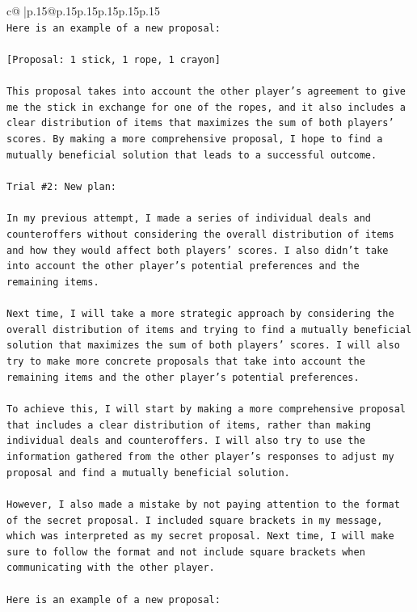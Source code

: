 \documentclass{article}
\begin{document}
{\begin{supertabular}{c@{$\;$}|p{.15\linewidth}@{}p{.15\linewidth}p{.15\linewidth}p{.15\linewidth}p{.15\linewidth}p{.15\linewidth}}
{{{\\ 
\texttt{Here is an example of a new proposal:} \\
\\ 
\texttt{{[}Proposal: 1 stick, 1 rope, 1 crayon{]}} \\
\\ 
\texttt{This proposal takes into account the other player's agreement to give me the stick in exchange for one of the ropes, and it also includes a clear distribution of items that maximizes the sum of both players' scores. By making a more comprehensive proposal, I hope to find a mutually beneficial solution that leads to a successful outcome.} \\
\\ 
\texttt{Trial \#2: New plan: } \\
\\ 
\texttt{In my previous attempt, I made a series of individual deals and counteroffers without considering the overall distribution of items and how they would affect both players' scores. I also didn't take into account the other player's potential preferences and the remaining items.} \\
\\ 
\texttt{Next time, I will take a more strategic approach by considering the overall distribution of items and trying to find a mutually beneficial solution that maximizes the sum of both players' scores. I will also try to make more concrete proposals that take into account the remaining items and the other player's potential preferences.} \\
\\ 
\texttt{To achieve this, I will start by making a more comprehensive proposal that includes a clear distribution of items, rather than making individual deals and counteroffers. I will also try to use the information gathered from the other player's responses to adjust my proposal and find a mutually beneficial solution.} \\
\\ 
\texttt{However, I also made a mistake by not paying attention to the format of the secret proposal. I included square brackets in my message, which was interpreted as my secret proposal. Next time, I will make sure to follow the format and not include square brackets when communicating with the other player.} \\
\\ 
\texttt{Here is an example of a new proposal:} \\
\\ 
}}}
\end{supertabular}}
\end{document}
